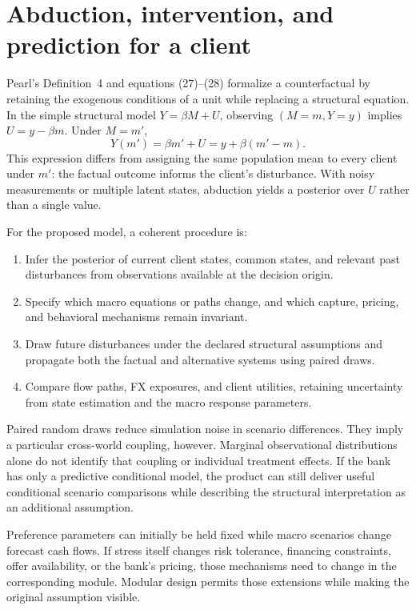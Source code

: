 \section{Abduction, intervention, and prediction for a client}
Pearl's Definition~4 and equations (27)--(28) formalize a counterfactual by retaining the exogenous conditions of a unit while replacing a structural equation. In the simple structural model $Y=\beta M+U$, observing $(M=m,Y=y)$ implies $U=y-\beta m$. Under $M=m'$,
\begin{equation}
Y(m')=\beta m'+U=y+\beta(m'-m).
\label{eq:unitlinear}
\end{equation}
This expression differs from assigning the same population mean to every client under $m'$: the factual outcome informs the client's disturbance. With noisy measurements or multiple latent states, abduction yields a posterior over $U$ rather than a single value.

For the proposed model, a coherent procedure is:
\begin{enumerate}[leftmargin=*,itemsep=2pt]
\item Infer the posterior of current client states, common states, and relevant past disturbances from observations available at the decision origin.
\item Specify which macro equations or paths change, and which capture, pricing, and behavioral mechanisms remain invariant.
\item Draw future disturbances under the declared structural assumptions and propagate both the factual and alternative systems using paired draws.
\item Compare flow paths, FX exposures, and client utilities, retaining uncertainty from state estimation and the macro response parameters.
\end{enumerate}
Paired random draws reduce simulation noise in scenario differences. They imply a particular cross-world coupling, however. Marginal observational distributions alone do not identify that coupling or individual treatment effects. If the bank has only a predictive conditional model, the product can still deliver useful conditional scenario comparisons while describing the structural interpretation as an additional assumption.

Preference parameters can initially be held fixed while macro scenarios change forecast cash flows. If stress itself changes risk tolerance, financing constraints, offer availability, or the bank's pricing, those mechanisms need to change in the corresponding module. Modular design permits those extensions while making the original assumption visible.
